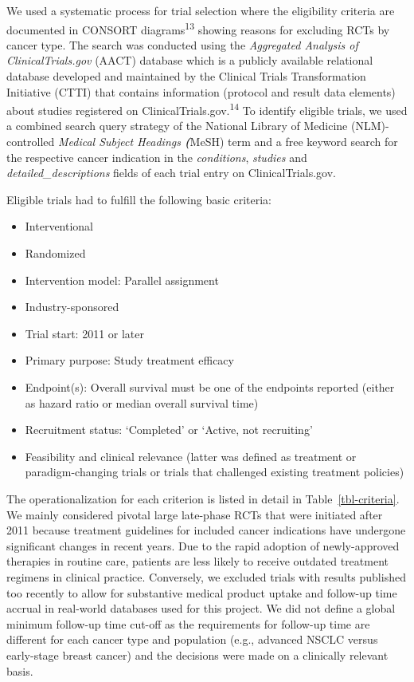\documentclass[
  letterpaper,
  DIV=11,
  numbers=noendperiod]{scrartcl}
\begin{document}
We used a systematic process for trial selection where the eligibility
criteria are documented in CONSORT diagrams\textsuperscript{13} showing
reasons for excluding RCTs by cancer type. The search was conducted
using the \emph{Aggregated Analysis of ClinicalTrials.gov} (AACT)
database which is a publicly available relational database developed and
maintained by the Clinical Trials Transformation Initiative (CTTI) that
contains information (protocol and result data elements) about studies
registered on ClinicalTrials.gov.\textsuperscript{14} To identify
eligible trials, we used a combined search query strategy of the
National Library of Medicine (NLM)-controlled \emph{Medical Subject
Headings \textbf{(}}MeSH) term and a free keyword search for the
respective cancer indication in the \emph{conditions}, \emph{studies}
and \emph{detailed\_descriptions} fields of each trial entry on
ClinicalTrials.gov.

Eligible trials had to fulfill the following basic criteria:

\begin{itemize}
\item
  Interventional
\item
  Randomized
\item
  Intervention model: Parallel assignment
\item
  Industry-sponsored
\item
  Trial start: 2011 or later
\item
  Primary purpose: Study treatment efficacy
\item
  Endpoint(s): Overall survival must be one of the endpoints reported
  (either as hazard ratio or median overall survival time)
\item
  Recruitment status: `Completed' or `Active, not recruiting'
\item
  Feasibility and clinical relevance (latter was defined as treatment or
  paradigm-changing trials or trials that challenged existing treatment
  policies)
\end{itemize}

The operationalization for each criterion is listed in detail in
Table~\ref{tbl-criteria}. We mainly considered pivotal large late-phase
RCTs that were initiated after 2011 because treatment guidelines for
included cancer indications have undergone significant changes in recent
years. Due to the rapid adoption of newly-approved therapies in routine
care, patients are less likely to receive outdated treatment regimens in
clinical practice. Conversely, we excluded trials with results published
too recently to allow for substantive medical product uptake and
follow-up time accrual in real-world databases used for this project. We
did not define a global minimum follow-up time cut-off as the
requirements for follow-up time are different for each cancer type and
population (e.g., advanced NSCLC versus early-stage breast cancer) and
the decisions were made on a clinically relevant basis.
\end{document}
